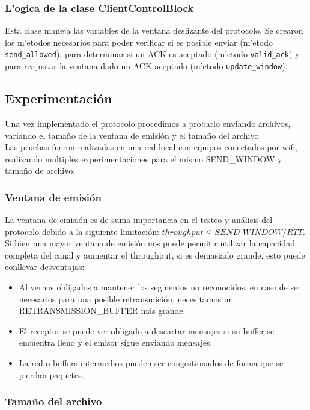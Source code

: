 \subsubsection{L'ogica de la clase ClientControlBlock}

Esta clase maneja las variables de la ventana deslizante del protocolo. Se crearon los m'etodos necesarios para poder verificar si es posible enviar (m'etodo \texttt{send\_allowed}), para determinar si un ACK es aceptado (m'etodo \texttt{valid\_ack}) y para reajustar la ventana dado un ACK aceptado (m'etodo \texttt{update\_window}).

\subsection{Experimentación}

Una vez implementado el protocolo procedimos a probarlo enviando archivos, variando el tamaño de la ventana de emisión y el tamaño del archivo.	 \\
\indent	Las pruebas fueron realizadas en una red local con equipos conectados por wifi, realizando multiples experimentaciones para el mismo SEND\_WINDOW y tamaño de archivo.

\subsubsection{Ventana de emisión}

La ventana de emisión es de suma importancia en el testeo y análisis del protocolo debido a la siguiente limitación: $throughput \leq SEND\_WINDOW / RTT$.	\\
Si bien una mayor ventana de emisión nos puede permitir utilizar la capacidad completa del canal y aumentar el throughput, si es demasiado grande, esto puede conllevar desventajas: 
\begin{itemize}
\item	Al vernos obligados a mantener los segmentos no reconocidos, en caso de ser necesarios para una posible retransmición, necesitamos un RETRANSMISSION\_BUFFER más grande.
\item	El receptor se puede ver obligado a descartar mensajes si su buffer se encuentra lleno y el emisor sigue enviando mensajes.
\item	La red o buffers intermedios pueden ser congestionados de forma que se pierdan paquetes.
\end{itemize}

\subsubsection{Tamaño del archivo}

